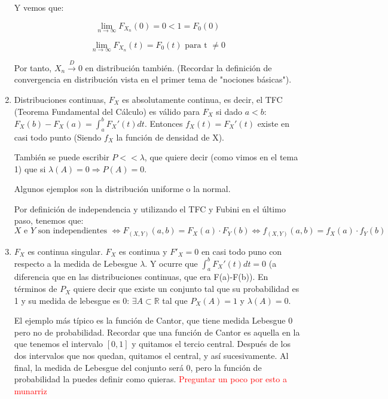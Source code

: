 \documentclass{apuntes}
\begin{document}
\begin{enumerate}
\begin{example}
Y vemos que:

\[
\lim_{n \rightarrow \infty} F_{X_n}(0)=0<1=F_0(0)
\]

\[
\lim_{n \rightarrow \infty} F_{X_n}(t)=F_0(t) \text{ para t $\neq 0$}
\]

Por tanto, $X_n \stackrel{D}{\rightarrow} 0$ en distribución también. (Recordar la definición de convergencia en distribución vista en el primer tema de "nociones básicas").

\end{example}

\item Distribuciones continuas, $F_X$ es absolutamente continua, es decir, el TFC (Teorema Fundamental del Cálculo) es válido para $F_X$ si dado $a<b$: $F_X(b)-F_X(a)=\int_{a}^{b} F_X'(t) dt$. Entonces $f_X(t)=F_X'(t)$ existe en casi todo punto (Siendo $f_X$ la función de densidad de X). 

También se puede escribir $P<<\lambda$, que quiere decir (como vimos en el tema 1) que si $\lambda(A)=0 \Rightarrow P(A)=0$.

Algunos ejemplos son la distribución uniforme o la normal.

\obs Por definición de independencia y utilizando el TFC y Fubini en el último paso, tenemos que:
\[
X \text{ e } Y \text{ son independientes } \Leftrightarrow F_{(X,Y)}(a,b)=F_X(a)\cdot F_Y(b) \Leftrightarrow f_{(X,Y)}(a,b)=f_X(a)\cdot f_Y(b)
\]

\item $F_X$ es continua singular. $F_X$ es continua y $F'_X=0$ en casi todo puno con  respecto a la medida de Lebesgue $\lambda$. Y ocurre que $\int_{a}^{b} F_X'(t) dt = 0$ (a diferencia que en las distribuciones continuas, que era F(a)-F(b)). En términos de $P_X$ quiere decir que existe un conjunto tal que su probabilidad es 1 y su medida de lebesgue es 0: $\exists A \subset \mathbb{R}$ tal que $P_X(A)=1$ y $\lambda(A)=0$.

\begin{example} 
El ejemplo más típico es la función de Cantor, que tiene medida Lebesgue 0 pero no de probabilidad. Recordar que una función de Cantor es aquella en la que tenemos el intervalo $[0,1]$ y quitamos el tercio central. Después de los dos intervalos que nos quedan, quitamos el central, y así sucesivamente. Al final, la medida de Lebesgue del conjunto será 0, pero la función de probabilidad la puedes definir como quieras. \textcolor{red}{Preguntar un poco por esto a munarriz}
\end{example}
\end{enumerate}
\end{document}
